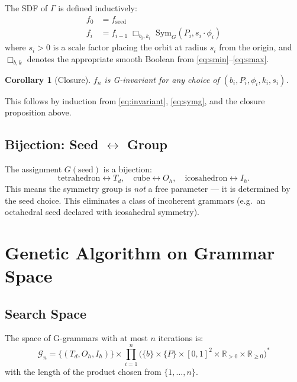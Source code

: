 \documentclass[11pt, a4paper]{article}
\newtheorem{corollary}{Corollary}[section]
\newcommand{\R}{\mathbb{R}}
\newcommand{\Td}{T_d}
\newcommand{\Oh}{O_h}
\newcommand{\Ih}{I_h}
\begin{document}
The SDF of $\Gamma$ is defined inductively:
\begin{align}
  f_0 &= f_{\mathrm{seed}} \\
  f_i &= f_{i-1} \;\Box_{b_i, k_i}\; \mathrm{Sym}_G(P_i, s_i \cdot \phi_i)
  \label{eq:eval}
\end{align}
where $s_i > 0$ is a scale factor placing the orbit at radius $s_i$ from the
origin, and $\Box_{b,k}$ denotes the appropriate smooth Boolean from
\cref{eq:smin}--\cref{eq:smax}.

\begin{corollary}[Closure]
$f_n$ is G-invariant for any choice of $(b_i, P_i, \phi_i, k_i, s_i)$.
\end{corollary}
This follows by induction from \cref{eq:invariant}, \cref{eq:symg}, and the
closure proposition above.

\subsection{Bijection: Seed \texorpdfstring{$\leftrightarrow$}{<->} Group}

The assignment $G(\mathrm{seed})$ is a bijection:
\begin{equation}
  \mathrm{tetrahedron} \leftrightarrow \Td, \quad
  \mathrm{cube} \leftrightarrow \Oh, \quad
  \mathrm{icosahedron} \leftrightarrow \Ih.
\end{equation}
This means the symmetry group is \emph{not} a free parameter — it is
determined by the seed choice. This eliminates a class of incoherent grammars
(e.g.\ an octahedral seed declared with icosahedral symmetry).

\section{Genetic Algorithm on Grammar Space}
\label{sec:ga}

\subsection{Search Space}

The space of G-grammars with at most $n$ iterations is:
\begin{equation}
  \mathcal{G}_n = \{(\Td, \Oh, \Ih)\} \times \prod_{i=1}^{n}
    \bigl(\{b\} \times \{P\} \times [0,1]^2 \times \R_{>0} \times \R_{\geq 0}\bigr)^*
\end{equation}
with the length of the product chosen from $\{1, \ldots, n\}$.
\end{document}
